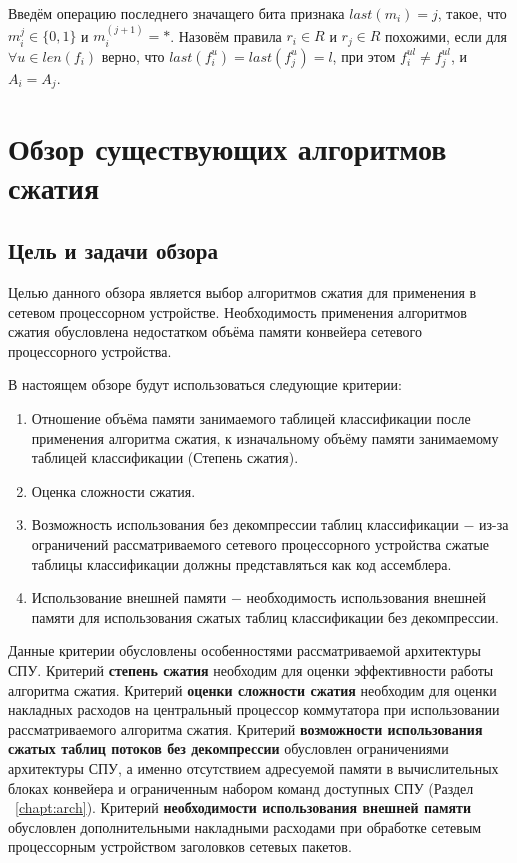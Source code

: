 \documentclass[a4paper, 12pt, titlepage, finall]{extreport}
\begin{document}
        Введём операцию последнего значащего бита признака \(last(m_i) = j\), такое, что \(m_i^j \in \{0, 1\}\) и \(m_i^{(j+1)} = *\). 
        Назовём правила \(r_i \in R\) и \(r_j \in R\) похожими, 
        если для \(\forall u \in len(f_i)\) верно, что \(last(f_i^u) = last(f_j^u) = l\), при этом \(f_i^{ul} \neq f_j^{ul}\), и \(A_i = A_j\).



    \chapter{Обзор существующих алгоритмов сжатия}
        \section{Цель и задачи обзора}
        Целью данного обзора является выбор алгоритмов сжатия для применения в сетевом процессорном устройстве. 
        Необходимость применения алгоритмов сжатия обусловлена недостатком объёма памяти конвейера сетевого процессорного устройства.
        
        В настоящем обзоре будут использоваться следующие критерии:
        \begin{enumerate}
            \item Отношение объёма памяти занимаемого таблицей классификации после применения алгоритма сжатия, 
                к изначальному объёму памяти занимаемому таблицей классификации (Степень сжатия).
            \item Оценка сложности сжатия.
            \item Возможность использования без декомпрессии таблиц классификации $-$ 
                из-за ограничений рассматриваемого сетевого процессорного устройства сжатые таблицы классификации 
                должны представляться как код ассемблера.
            \item Использование внешней памяти $-$ необходимость использования внешней памяти 
                для использования сжатых таблиц классификации без декомпрессии.
        \end{enumerate}

        Данные критерии обусловлены особенностями рассматриваемой архитектуры СПУ. 
        Критерий \textbf{степень сжатия} необходим для оценки эффективности работы алгоритма сжатия.
        Критерий \textbf{оценки сложности сжатия} необходим для оценки накладных расходов на центральный процессор коммутатора при использовании рассматриваемого
        алгоритма сжатия.
        Критерий \textbf{возможности использования сжатых таблиц потоков без декомпрессии} обусловлен ограничениями архитектуры СПУ, а именно
        отсутствием адресуемой памяти в вычислительных блоках конвейера и ограниченным набором команд доступных СПУ (Раздел ~\ref{chapt:arch}).
        Критерий \textbf{необходимости использования внешней памяти} обусловлен дополнительными накладными расходами при обработке сетевым процессорным устройством 
        заголовков сетевых пакетов.
\end{document}

